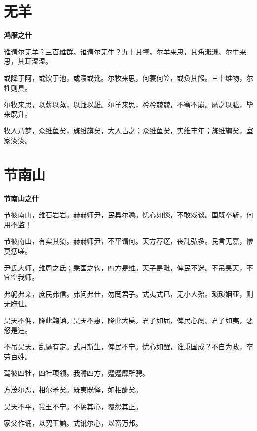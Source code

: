 \documentclass[12pt,a4paper]{ctexbook}
\begin{document}
\section{无羊}
\textbf{鸿雁之什}\par\vspace{0.5em}
谁谓尔无羊？三百维群。谁谓尔无牛？九十其犉。尔羊来思，其角濈濈。尔牛来思，其耳湿湿。\par
或降于阿，或饮于池，或寝或讹。尔牧来思，何蓑何笠，或负其餱。三十维物，尔牲则具。\par
尔牧来思，以薪以蒸，以雌以雄。尔羊来思，矜矜兢兢，不骞不崩。麾之以肱，毕来既升。\par
牧人乃梦，众维鱼矣，旐维旟矣，大人占之；众维鱼矣，实维丰年；旐维旟矣，室家溱溱。\par

\section{节南山}
\textbf{节南山之什}\par\vspace{0.5em}
节彼南山，维石岩岩。赫赫师尹，民具尔瞻。忧心如惔，不敢戏谈。国既卒斩，何用不监！\par
节彼南山，有实其猗。赫赫师尹，不平谓何。天方荐瘥，丧乱弘多。民言无嘉，惨莫惩嗟。\par
尹氏大师，维周之氐；秉国之钧，四方是维。天子是毗，俾民不迷。不吊昊天，不宜空我师。\par
弗躬弗亲，庶民弗信。弗问弗仕，勿罔君子。式夷式已，无小人殆。琐琐姻亚，则无膴仕。\par
昊天不佣，降此鞠訩。昊天不惠，降此大戾。君子如届，俾民心阕。君子如夷，恶怒是违。\par
不吊昊天，乱靡有定。式月斯生，俾民不宁。忧心如酲，谁秉国成？不自为政，卒劳百姓。\par
驾彼四牡，四牡项领。我瞻四方，蹙蹙靡所骋。\par
方茂尔恶，相尔矛矣。既夷既怿，如相酬矣。\par
昊天不平，我王不宁。不惩其心，覆怨其正。\par
家父作诵，以究王訩。式讹尔心，以畜万邦。\par
\end{document}

